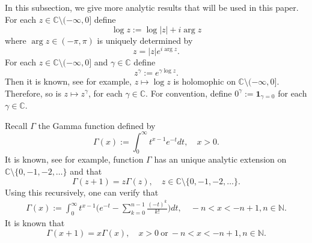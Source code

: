 \documentclass[12pt,oneside,english]{amsart}
\theoremstyle{plain}
\theoremstyle{definition}
\numberwithin{equation}{section}
\newcommand{\added}[1]{{\color{blue}#1}}\newcommand{\deleted}[1]{{\color{red}#1}}
\begin{document}
\added{
\subsection{}
	In this subsection, we give more analytic results that will be used in this paper.
	For each $z\in \mathbb C\setminus (-\infty,0]$ define 
\[
	\log z := \log |z| + i \arg z
\] 
	where $\arg z \in (-\pi,\pi)$ is uniquely determined by
\[
	z = |z|e^{i \arg z}.
\] 	
	For each $z\in \mathbb C\setminus (-\infty,0]$ and $\gamma \in \mathbb C$ define
\[
	z^\gamma := e^{\gamma \log z}.
\]
	Then it is known, see \cite[Theorem 6.1]{SteinShakarchi2003Complex} for example, $z\mapsto \log z$ is holomophic on $\mathbb C\setminus (-\infty,0]$.
	Therefore, so is $z\mapsto z^\gamma$, for each $\gamma \in \mathbb C$.
	For convention, define $0^\gamma := \mathbf 1_{\gamma = 0}$ for each $\gamma \in \mathbb C$.


    Recall $\Gamma$ the Gamma function defined by
\begin{equation}
    \Gamma (x) := \int_0^\infty t^{x-1} e^{-t}dt,
    \quad x>0.
\end{equation}
	It is known, see \cite[Theorem 6.1.3 and its following remark]{SteinShakarchi2003Complex} for example, function $\Gamma$ has an unique analytic extension on $\mathbb C\setminus\{0, -1,-2,\dots\}$ and that
\[
	\Gamma(z+1) = z \Gamma(z),\quad z\in \mathbb C\setminus\{0, -1,-2,\dots\}.
\]
	Using this recursively, one can verify that
\begin{align}
\label{eq: definition of Gamma function}
    \Gamma(x)
    := \int_0^\infty t^{x-1} \Big(e^{-t} - \sum_{k=0}^{n-1} \frac{(-t)^k}{k!}\Big) dt,
    \quad -n< x< -n+1, n\in \mathbb N.
\end{align}
    It is known that
\begin{equation}
    \Gamma(x+1) = x\Gamma(x),
    \quad x>0~\text{or}~-n< x< -n+1, n\in \mathbb N.
\end{equation}

}
\end{document}

